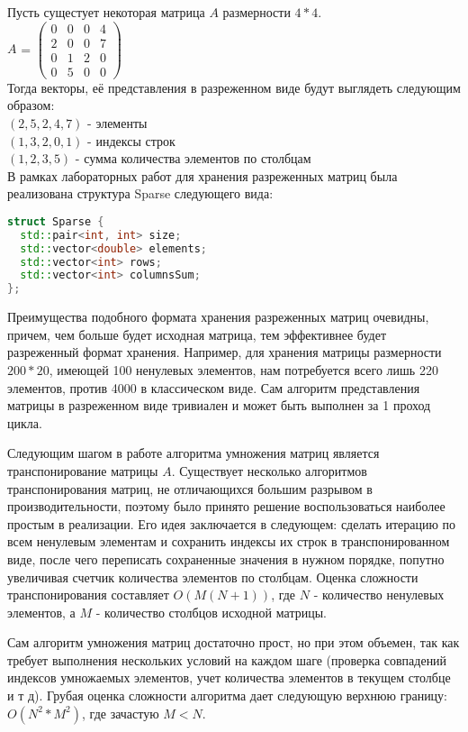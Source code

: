\documentclass[12pt]{article}
\begin{document}
Пусть сущестует некоторая матрица $A$ размерности $4*4$.\\

$A$ = $\begin{pmatrix}
0 & 0 & 0 & 4 \\
2 & 0 & 0 & 7 \\
0 & 1 & 2 & 0 \\
0 & 5 & 0 & 0
\end{pmatrix}$ \\

Тогда векторы, её представления в разреженном виде будут выглядеть следующим образом: \\
$(2, 5, 2, 4 ,7)$ - элементы \\
$(1, 3, 2, 0, 1)$  - индексы строк\\
$(1, 2, 3, 5)$ - сумма количества элементов по столбцам \\

В рамках лабораторных работ для хранения разреженных матриц была реализована структура Sparse следующего вида:
\lstset{style=mystyle}
\begin{lstlisting}[language=C++]
struct Sparse {
  std::pair<int, int> size;
  std::vector<double> elements;
  std::vector<int> rows;
  std::vector<int> columnsSum;
};
\end{lstlisting}

Преимущества подобного формата хранения разреженных матриц очевидны, причем, чем больше будет исходная матрица, тем эффективнее будет разреженный формат хранения. Например, для хранения матрицы размерности $200*20$, имеющей 100 ненулевых элементов, нам потребуется всего лишь 220 элементов, против 4000 в классическом виде. Сам алгоритм представления матрицы в разреженном виде тривиален и может быть выполнен за 1 проход цикла. 

Следующим шагом в работе алгоритма умножения матриц является транспонирование матрицы $A$. Существует несколько алгоритмов транспонирования матриц, не отличающихся большим разрывом в производительности, поэтому было принято решение воспользоваться наиболее простым в реализации. Его идея заключается в следующем: сделать итерацию по всем ненулевым элементам и сохранить индексы их строк в транспонированном виде, после чего переписать сохраненные значения в нужном порядке, попутно увеличивая счетчик количества элементов по столбцам. Оценка сложности транспонирования составляет $O(M(N + 1))$, где $N$ - количество ненулевых элементов, а $M$ - количество столбцов исходной матрицы. 

Сам алгоритм умножения матриц достаточно прост, но при этом объемен, так как требует выполнения нескольких условий на каждом шаге (проверка совпадений индексов умножаемых элементов, учет количества элементов в текущем столбце и т д). Грубая оценка сложности алгоритма дает следующую верхнюю границу: $O(N^2 * M^2)$, где зачастую $M < N$. 
\end{document}
